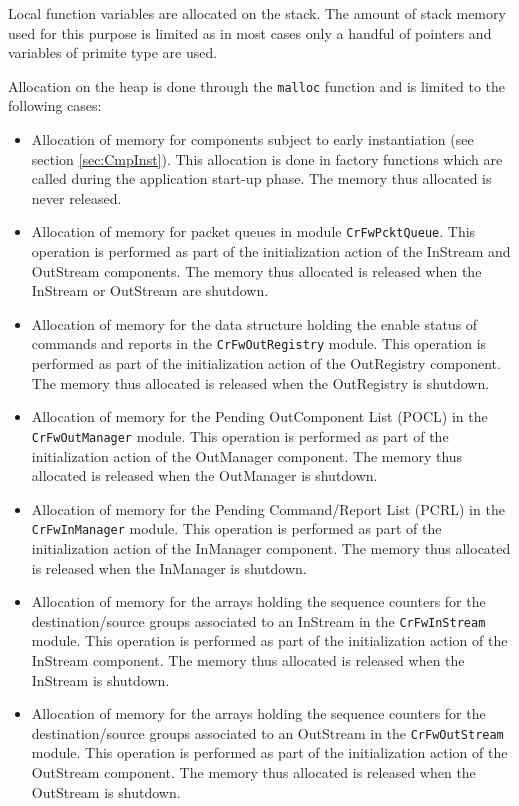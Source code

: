 \documentclass{pnp_article}
\begin{document}
Local function variables are allocated on the stack. The amount of stack memory used for this purpose is limited as in most cases only a handful of pointers and variables of primite type are used.

Allocation on the heap is done through the \texttt{malloc} function and is limited to the following cases:

\begin{itemize}
\item Allocation of memory for components subject to early instantiation (see section \ref{sec:CmpInst}). This allocation is done in factory functions which are called during the application start-up phase. The memory thus allocated is never released.
\item Allocation of memory for packet queues in module \texttt{CrFwPcktQueue}. This operation is performed as part of the initialization action of the InStream and OutStream components. The memory thus allocated is released when the InStream or OutStream are shutdown.
\item Allocation of memory for the data structure holding the enable status of commands and reports in the \texttt{CrFwOutRegistry} module. This operation is performed as part of the initialization action of the OutRegistry component. The memory thus allocated is released when the OutRegistry is shutdown.
\item Allocation of memory for the Pending OutComponent List (POCL) in the \texttt{CrFwOutManager} module. This operation is performed as part of the initialization action of the OutManager component. The memory thus allocated is released when the OutManager is shutdown.
\item Allocation of memory for the Pending Command/Report List (PCRL) in the \texttt{CrFwInManager} module. This operation is performed as part of the initialization action of the InManager component. The memory thus allocated is released when the InManager is shutdown.
\item Allocation of memory for the arrays holding the sequence counters for the destination/source groups associated to an InStream in the \texttt{CrFwInStream} module. This operation is performed as part of the initialization action of the InStream component. The memory thus allocated is released when the InStream is shutdown.
\item Allocation of memory for the arrays holding the sequence counters for the destination/source groups associated to an OutStream in the \texttt{CrFwOutStream} module. This operation is performed as part of the initialization action of the OutStream component. The memory thus allocated is released when the OutStream is shutdown.
\end{itemize}
\end{document}
